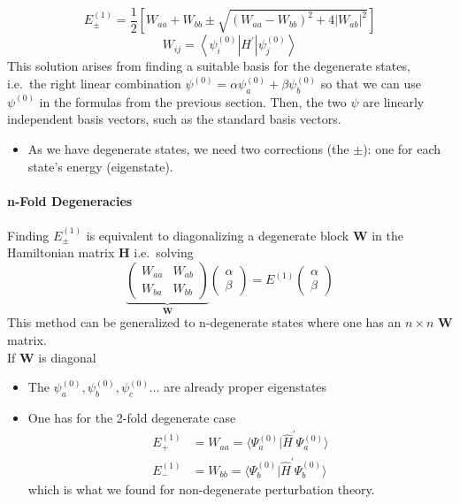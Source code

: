 \newpar{}

\begin{equation*}
    E_{\pm}^{(1)}=\frac{1}{2}\left[W_{aa}+W_{bb}\pm\sqrt{{(W_{aa}-W_{bb})}^{2}+4 |W_{ab}|^{2}}\right]
\end{equation*}
\begin{equation*}
    W_{ij}=\left\langle\psi_{i}^{(0)} \left| H^{\prime} \right|\psi_{j}^{(0)}\right\rangle
\end{equation*}
This solution arises from finding a suitable basis for the degenerate states, i.e.\ the right linear combination $\psi^{(0)}=\alpha\psi_a^{(0)}+\beta\psi_b^{(0)}$ so that we can use $\psi^{(0)}$ in the formulas from the previous section. Then, the two $\psi$ are linearly independent basis vectors, such as the standard basis vectors.

\newpar{}
\begin{itemize}
    \item As we have degenerate states, we need two corrections (the $\pm$): one for each state's energy (eigenstate).
\end{itemize}

\paragraph{n-Fold Degeneracies}
Finding $E_{\pm}^{(1)}$ is equivalent to diagonalizing a degenerate block $\mathbf{W}$ in the Hamiltonian matrix $\mathbf{H}$ i.e.\ solving
\begin{equation*}
    \underbrace{
        \left(\begin{array}{cc}
            W_{aa} & W_{ab} \\
            W_{ba} & W_{bb}
        \end{array}\right)}_{\mathbf{W}}
    \left(\begin{array}{c}
            \alpha \\
            \beta
        \end{array}\right)
    =E^{(1)}\left(\begin{array}{c}
            \alpha \\
            \beta
        \end{array}\right)
\end{equation*}
This method can be generalized to n-degenerate states where one has an $n\times n$ $\mathbf{W}$ matrix.\\
If $\mathbf{W}$ is diagonal
\begin{itemize}
    \item The $\psi_a^{(0)},\psi_b^{(0)},\psi_c^{(0)} \dots $ are already proper eigenstates
    \item One has for the 2-fold degenerate case
          \begin{align*}
              E_{+}^{(1)} & =W_{aa}=\langle\Psi_{a}^{(0)}|\hat{H}^{\prime}\Psi_{a}^{(0)}\rangle \\
              E_{-}^{(1)} & =W_{bb}=\langle\Psi_{b}^{(0)}|\hat{H}^{\prime}\Psi_{b}^{(0)}\rangle
          \end{align*}
          which is what we found for non-degenerate perturbation theory.
\end{itemize}

